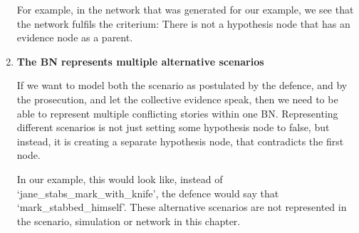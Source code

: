 \begin{enumerate}
For example, in the network that was generated for our example, we see that the network fulfils the criterium: There is not a hypothesis node that has an evidence node as a parent.

\item \textbf{The BN represents multiple alternative scenarios}

If we want to model both the scenario as postulated by the defence, and by the prosecution, and let the collective evidence speak, then we need to be able to represent multiple conflicting stories within one BN. Representing different scenarios is not just setting some hypothesis node to false, but instead, it is creating a separate hypothesis node, that contradicts the first node.

 In our example, this would look like, instead of `jane\_stabs\_mark\_with\_knife', the defence would say that `mark\_stabbed\_himself'. These alternative scenarios are not represented in the scenario, simulation or network in this chapter.

\end{enumerate}

